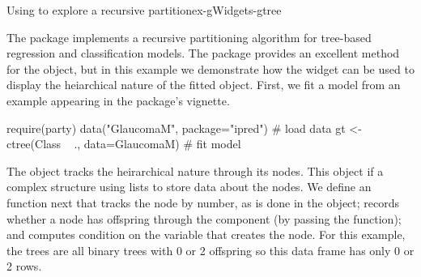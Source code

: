 \begin{example}{Using  to explore a recursive partition}{ex-gWidgets-gtree}

The  package implements a recursive partitioning algorithm
for tree-based regression and classification models. The package
provides an excellent  method for the object, but in this
example we demonstrate how the  widget can be used to display
the heiarchical nature of the fitted object. First, we fit a model from an
example appearing in the package's vignette.

\begin{Schunk}
\begin{Sinput}
 require(party)
 data("GlaucomaM", package="ipred")      # load data
 gt <- ctree(Class ~ ., data=GlaucomaM)  # fit model
\end{Sinput}
\end{Schunk}

The  object tracks the heirarchical nature through its
nodes. This object if a complex structure using lists to store data
about the nodes. We define an  function next that
tracks the node by number, as is done in the  object;
records whether a node has offspring through the 
component (by passing the  function); and computes
condition on the variable that creates the node. For this example, the
trees are all binary trees with 0 or 2 offspring so this data frame
has only 0 or 2 rows.

\begin{Schunk}
\end{Schunk}


\end{example}
